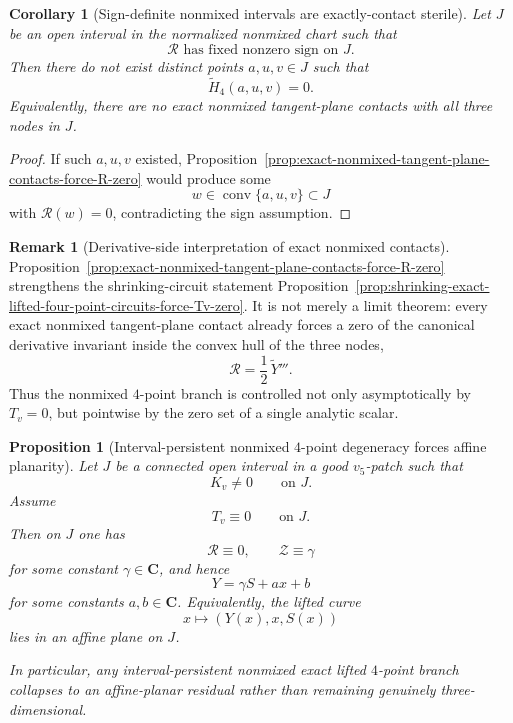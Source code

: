 \documentclass[11pt,a4paper]{amsart}
\theoremstyle{plain}
\newtheorem{proposition}[theorem]{Proposition}
\newtheorem{corollary}[theorem]{Corollary}
\theoremstyle{definition}
\newtheorem{remark}[theorem]{Remark}
\begin{document}
\begin{corollary}[Sign-definite nonmixed intervals are exactly-contact sterile]
\label{cor:sign-definite-R-excludes-exact-nonmixed-contacts}
Let $J$ be an open interval in the normalized nonmixed chart such that
\[
\mathcal R \text{ has fixed nonzero sign on }J.
\]
Then there do not exist distinct points $a,u,v\in J$ such that
\[
\widetilde H_4(a,u,v)=0.
\]
Equivalently, there are no exact nonmixed tangent-plane contacts with all three
nodes in $J$.
\end{corollary}

\begin{proof}
If such $a,u,v$ existed, Proposition~\ref{prop:exact-nonmixed-tangent-plane-contacts-force-R-zero}
would produce some
\[
w\in \operatorname{conv}\{a,u,v\}\subset J
\]
with $\mathcal R(w)=0$, contradicting the sign assumption.
\end{proof}

\begin{remark}[Derivative-side interpretation of exact nonmixed contacts]
\label{rem:exact-nonmixed-contacts-are-R-zero-forcing}
Proposition~\ref{prop:exact-nonmixed-tangent-plane-contacts-force-R-zero}
strengthens the shrinking-circuit statement
Proposition~\ref{prop:shrinking-exact-lifted-four-point-circuits-force-Tv-zero}.
It is not merely a limit theorem: every exact nonmixed tangent-plane contact
already forces a zero of the canonical derivative invariant inside the convex
hull of the three nodes,
\[
\mathcal R=\frac12\,\widetilde Y'''.
\]
Thus the nonmixed $4$-point branch is controlled not only asymptotically by
$T_v=0$, but pointwise by the zero set of a single analytic scalar.
\end{remark}

\begin{proposition}[Interval-persistent nonmixed $4$-point degeneracy forces affine planarity]
\label{prop:interval-persistent-nonmixed-four-point-forces-affine-planarity}
Let $J$ be a connected open interval in a good $v_5$-patch such that
\[
K_v\neq 0
\qquad\text{on }J.
\]
Assume
\[
T_v\equiv 0
\qquad\text{on }J.
\]
Then on $J$ one has
\[
\mathcal R\equiv 0,
\qquad
\mathcal Z\equiv \gamma
\]
for some constant $\gamma\in\mathbf C$, and hence
\[
Y=\gamma S+ax+b
\]
for some constants $a,b\in\mathbf C$. Equivalently, the lifted curve
\[
x\longmapsto (Y(x),x,S(x))
\]
lies in an affine plane on $J$.

In particular, any interval-persistent nonmixed exact lifted $4$-point branch
collapses to an affine-planar residual rather than remaining genuinely
three-dimensional.
\end{proposition}
\end{document}
